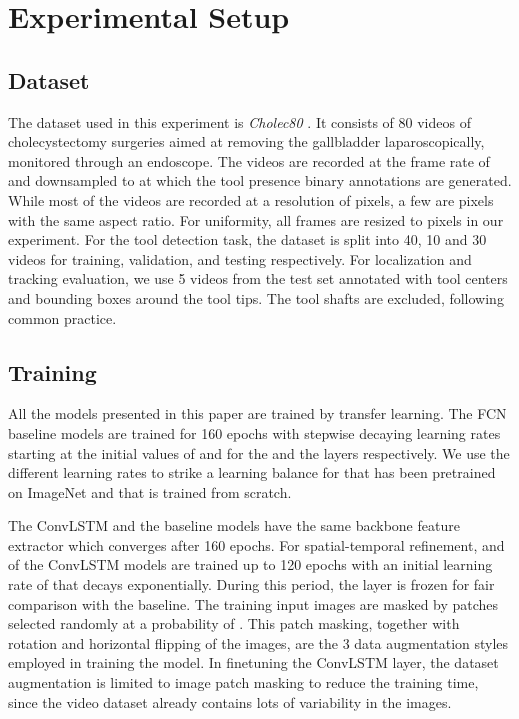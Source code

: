 \documentclass{svjour3}                     \smartqed
\begin{document}
\section{Experimental Setup}
\label{sec:experiments}
\subsection{Dataset}\label{sec:dataset_analysis}
The dataset used in this experiment is \textit{Cholec80} \cite{tmi:twinanda2017endonet}. It consists of 80 videos of cholecystectomy surgeries aimed at removing the gallbladder laparoscopically, monitored through an endoscope.
The videos are recorded at the frame rate of  and downsampled to  at which the tool presence binary annotations are generated. While most of the videos are recorded at a resolution of  pixels, a few are  pixels with the same aspect ratio. For uniformity, all frames are resized to  pixels in our experiment. 
For the tool detection task, the dataset is split into 40, 10 and 30 videos for training, validation, and testing respectively. 
For localization and tracking evaluation, we use 5 videos from the test set annotated with tool centers and bounding boxes around the tool tips. The tool shafts are excluded, following common practice.

\subsection{Training}\label{sec:training}
All the models presented in this paper are trained by transfer learning. 
The FCN baseline models are trained for 160 epochs with stepwise decaying learning rates starting at the initial values of  and  for the  and the  layers respectively. We use the different learning rates to strike a learning balance for  that has been pretrained on ImageNet and  that is trained from scratch.

The ConvLSTM and the baseline models have the same backbone feature extractor which converges after 160 epochs. 
For spatial-temporal refinement,  and  of the ConvLSTM models are trained up to 120 epochs with an initial learning rate of  that decays exponentially. 
During this period, the  layer is frozen for fair comparison with the baseline. 
The training input images are masked by  patches selected randomly at a probability of . This patch masking, together with rotation and horizontal flipping of the images, are the 3 data augmentation styles employed in training the  model. In finetuning the ConvLSTM layer, the dataset augmentation is limited to image patch masking to reduce the training time, since the video dataset already contains lots of variability in the images.
\end{document}
